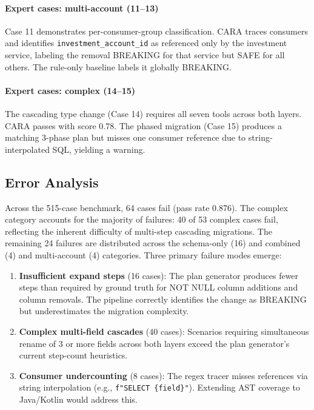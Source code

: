 \documentclass[10pt,twocolumn]{article}
\begin{document}
\paragraph{Expert cases: multi-account (11--13)} Case 11 demonstrates per-consumer-group
classification. CARA traces consumers and identifies \texttt{investment\_account\_id}
as referenced only by the investment service, labeling the removal BREAKING for
that service but SAFE for all others. The rule-only baseline labels it globally BREAKING.

\paragraph{Expert cases: complex (14--15)} The cascading type change (Case 14)
requires all seven tools across both layers. CARA passes with score 0.78. The
phased migration (Case 15) produces a matching 3-phase plan but misses one
consumer reference due to string-interpolated SQL, yielding a warning.

\subsection{Error Analysis}

Across the 515-case benchmark, 64 cases fail (pass rate 0.876). The complex
category accounts for the majority of failures: 40 of 53 complex cases fail,
reflecting the inherent difficulty of multi-step cascading migrations. The
remaining 24 failures are distributed across the schema-only (16) and combined
(4) and multi-account (4) categories. Three primary failure modes emerge:

\begin{enumerate}[leftmargin=*,itemsep=1pt,topsep=2pt]
  \item \textbf{Insufficient expand steps} (16 cases): The plan generator
  produces fewer steps than required by ground truth for NOT NULL column
  additions and column removals. The pipeline correctly identifies the
  change as BREAKING but underestimates the migration complexity.
  \item \textbf{Complex multi-field cascades} (40 cases): Scenarios
  requiring simultaneous rename of 3 or more fields across both layers
  exceed the plan generator's current step-count heuristics.
  \item \textbf{Consumer undercounting} (8 cases): The regex tracer misses
  references via string interpolation (e.g., \texttt{f"SELECT \{field\}"}).
  Extending AST coverage to Java/Kotlin would address this.
\end{enumerate}
\end{document}
